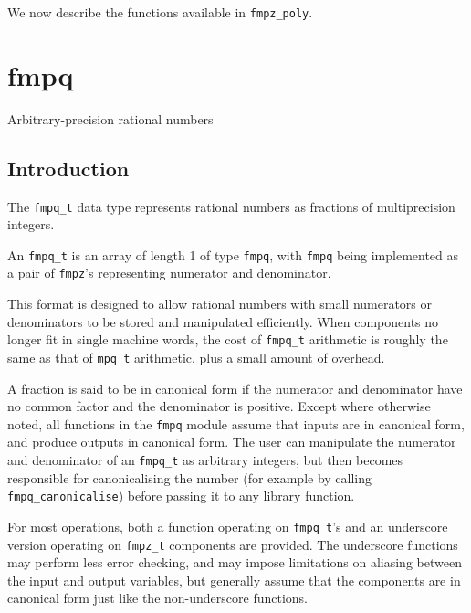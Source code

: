 \documentclass[a4paper,10pt]{book}
\newcommand{\code}{\lstinline}
\begin{document}
We now describe the functions available in \code{fmpz_poly}.




\chapter{fmpq}
\epigraph{Arbitrary-precision rational numbers}{}

\section{Introduction}

The \code{fmpq_t} data type represents rational numbers
as fractions of multiprecision integers.

An \code{fmpq_t} is an array of length 1 of type \code{fmpq},
with \code{fmpq} being implemented as a pair of \code{fmpz}'s
representing numerator and denominator.

This format is designed to allow rational numbers with small
numerators or denominators to be stored and manipulated
efficiently. When components no longer fit in single
machine words, the cost of \code{fmpq_t} arithmetic
is roughly the same as that of \code{mpq_t} arithmetic,
plus a small amount of overhead.

A fraction is said to be in canonical form if the numerator
and denominator have no common factor and the denominator is
positive. Except where otherwise noted, all functions in the
\code{fmpq} module assume that
inputs are in canonical form, and produce outputs in canonical form.
The user can manipulate the numerator and denominator of an
\code{fmpq_t} as arbitrary integers, but then becomes
responsible for canonicalising the number (for example by calling
\code{fmpq_canonicalise}) before passing it to any library function.

For most operations, both a function operating
on \code{fmpq_t}'s and an underscore version operating
on \code{fmpz_t} components are provided. The underscore
functions may perform less error checking,
and may impose limitations on aliasing between the
input and output variables, but 
generally assume that the components are in
canonical form just like the non-underscore functions.
\end{document}
